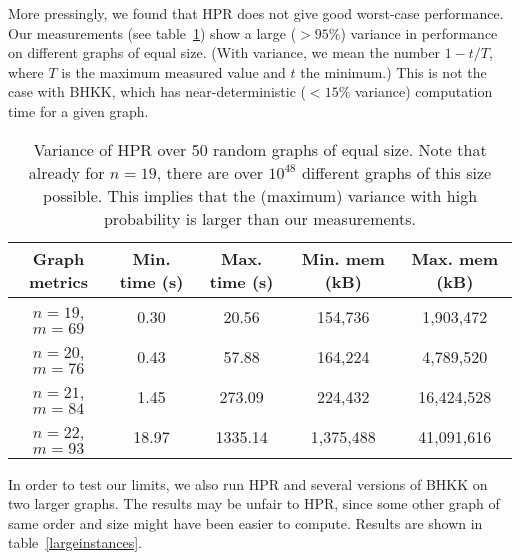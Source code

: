\documentclass{cslthse-msc}
\begin{document}
More pressingly, we found that HPR does not give good worst-case performance. Our measurements (see table~\ref{variance}) show a large ($> 95\%$) variance in performance on different graphs of equal size. (With variance, we mean the number $1 - t/T$, where $T$ is the maximum measured value and $t$ the minimum.) This is not the case with BHKK, which has near-deterministic ($< 15\%$ variance) computation time for a given graph.
\begin{table}[H]\centering
\begin{tabular}{c|cccc} \hline
  Graph metrics		& Min. time (s)	& Max. time (s)	& Min. mem (kB)	& Max. mem (kB) \\ \hline
  $n = 19$, $m = 69$ 	& 0.30 		& 20.56		& 154,736	& 1,903,472\\ \hline
  $n = 20$, $m = 76$ 	& 0.43 		& 57.88		& 164,224	& 4,789,520 \\ \hline
  $n = 21$, $m = 84$ 	& 1.45 		& 273.09	& 224,432	& 16,424,528 \\ \hline
  $n = 22$, $m = 93$ 	& 18.97		& 1335.14	& 1,375,488	& 41,091,616 \\ \hline
\end{tabular}
\caption{Variance of HPR over 50 random graphs of equal size. Note that already for $n = 19$, there are over $10^{48}$ different graphs of this size possible. This implies that the (maximum) variance with high probability is larger than our measurements.}
\label{variance}
\end{table}
In order to test our limits, we also run HPR and several versions of BHKK on two larger graphs. The results may be unfair to HPR, since some other graph of same order and size might have been easier to compute. Results are shown in table~\ref{largeinstances}.
\end{document}
